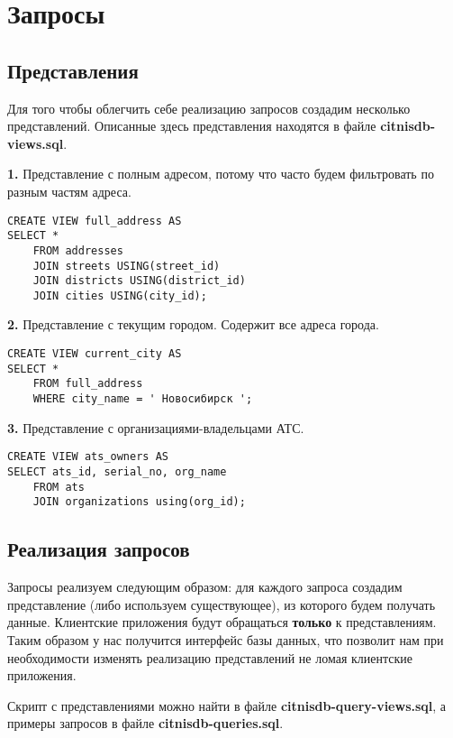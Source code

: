 \documentclass{report}
\begin{document}
\chapter{Запросы}

\section{Представления}

Для того чтобы облегчить себе реализацию запросов создадим несколько
представлений. Описанные здесь представления находятся в файле 
\textbf{citnisdb-views.sql}.

\textbf{1.} Представление с полным адресом, потому что часто будем фильтровать
по разным частям адреса.

\begin{lstlisting}
CREATE VIEW full_address AS
SELECT *
    FROM addresses 
    JOIN streets USING(street_id)
    JOIN districts USING(district_id)
    JOIN cities USING(city_id);
\end{lstlisting}

\textbf{2.} Представление с текущим городом. Содержит все адреса города.

\begin{lstlisting}
CREATE VIEW current_city AS
SELECT *
    FROM full_address 
    WHERE city_name = ' Новосибирск ';
\end{lstlisting}

\textbf{3.} Представление с организациями-владельцами АТС.

\begin{lstlisting}
CREATE VIEW ats_owners AS
SELECT ats_id, serial_no, org_name
    FROM ats 
    JOIN organizations using(org_id);
\end{lstlisting}

\section{Реализация запросов}

Запросы реализуем следующим образом: для каждого запроса
создадим представление (либо используем существующее), 
из которого будем получать данные. Клиентские приложения
будут обращаться \textbf{только} к представлениям. Таким образом у нас 
получится интерфейс базы данных, что позволит нам при необходимости 
изменять реализацию представлений не ломая клиентские 
приложения. 

Скрипт с представлениями можно найти в файле \textbf{citnisdb-query-views.sql},
а примеры запросов в файле \textbf{citnisdb-queries.sql}.
\end{document}
